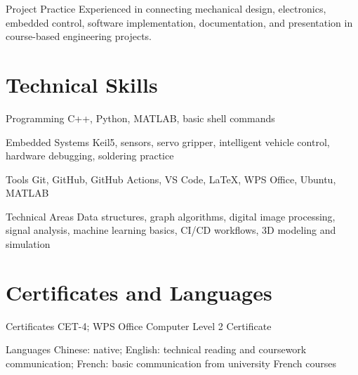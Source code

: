 \documentclass[10pt,a4paper,sans]{moderncv}
\begin{document}
\cvitem
{Project Practice}
{Experienced in connecting mechanical design, electronics, embedded control, software implementation, documentation, and presentation in course-based engineering projects.}

\section{Technical Skills}

\cvitem
{Programming}
{C++, Python, MATLAB, basic shell commands}

\cvitem
{Embedded Systems}
{Keil5, sensors, servo gripper, intelligent vehicle control, hardware debugging, soldering practice}

\cvitem
{Tools}
{Git, GitHub, GitHub Actions, VS Code, LaTeX, WPS Office, Ubuntu, MATLAB}

\cvitem
{Technical Areas}
{Data structures, graph algorithms, digital image processing, signal analysis, machine learning basics, CI/CD workflows, 3D modeling and simulation}

\section{Certificates and Languages}

\cvitem
{Certificates}
{CET-4; WPS Office Computer Level 2 Certificate}

\cvitem
{Languages}
{Chinese: native; English: technical reading and coursework communication; French: basic communication from university French courses}
\end{document}
